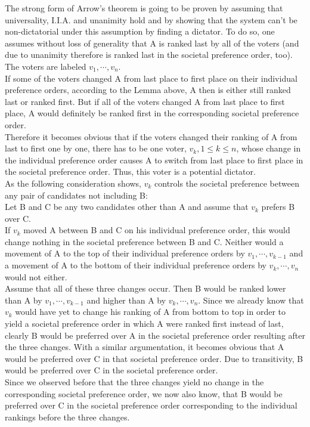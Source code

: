 The strong form of Arrow's theorem is going to be proven by assuming that universality, I.I.A. and unanimity hold and by showing that the system can't be non-dictatorial under this assumption by finding a dictator. To do so, one assumes without loss of generality that A is ranked last by all of the voters (and due to unanimity therefore is ranked last in the societal preference order, too). The voters are labeled $v_1, \cdots, v_n$. \\
If some of the voters changed A from last place to first place on their individual preference orders, according to the Lemma above, A then is either still ranked last or ranked first. But if all of the voters changed A from last place to first place, A would definitely be ranked first in the corresponding societal preference order. \\
Therefore it becomes obvious that if the voters changed their ranking of A from last to first one by one, there has to be one voter, $v_k, 1\leq k \leq n$, whose change in the individual preference order causes A to switch from last place to first place in the societal preference order. Thus, this voter is a potential dictator. \\
As the following consideration shows, $v_k$ controls the societal preference between any pair of candidates not including B: \\ 
\noindent Let B and C be any two candidates other than A and assume that $v_k$ prefers B over C. \\ 
\noindent If $v_k$ moved A between B and C on his individual preference order, this would change nothing in the societal preference between B and C. Neither would a movement of A to the top of their individual preference orders by $v_1, \cdots, v_{k-1}$ and a movement of A to the bottom of their individual preference orders by $v_k, \cdots, v_n$ would not either. \\
Assume that all of these three changes occur. Then B would be ranked lower than A by $v_1, \cdots, v_{k-1}$ and higher than A by $v_k, \cdots, v_n$. Since we already know that $v_k$ would have yet to change his ranking of A from bottom to top in order to yield a societal preference order in which A were ranked first instead of last, clearly B would be preferred over A in the societal preference order resulting after the three changes. With a similar argumentation, it becomes obvious that A would be preferred over C in that societal preference order. Due to transitivity, B would be preferred over C in the societal preference order. \\
Since we observed before that the three changes yield no change in the corresponding societal preference order, we now also know, that B would be preferred over C in the societal preference order corresponding to the individual rankings before the three changes. \\


